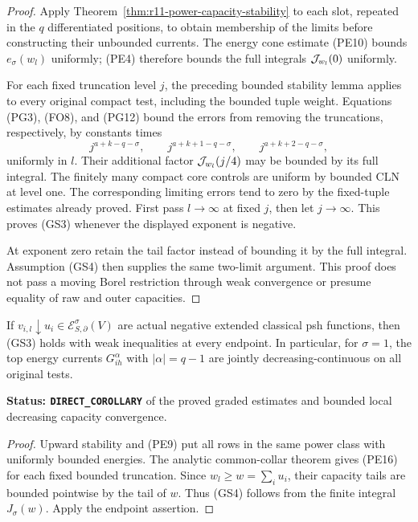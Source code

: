 \begin{proof}
Apply Theorem~\ref{thm:r11-power-capacity-stability} to
each slot, repeated in the $q$ differentiated positions,
to obtain membership of the limits before constructing
their unbounded currents. The energy cone estimate
(PE10) bounds $e_\sigma(w_l)$ uniformly; (PE4) therefore
bounds the full integrals $ {\cal J}_{w_l}(0)$ uniformly.

For each fixed truncation level $j$, the preceding
bounded stability lemma applies to every original
compact test, including the bounded tuple weight.
Equations (PG3), (FO8), and (PG12) bound the errors
from removing the truncations, respectively, by
constants times
\[
 j^{a+k-q-\sigma},\qquad
 j^{a+k+1-q-\sigma},\qquad
 j^{a+k+2-q-\sigma},
 \tag{GS5}
\]
uniformly in $l$. Their additional factor
$ {\cal J}_{w_l}(j/4)$ may be bounded by its full
integral. The finitely many compact core controls
are uniform by bounded CLN at level one.
The corresponding limiting errors tend to zero
by the fixed-tuple estimates already proved.
First pass $l\to\infty$ at fixed $j$, then let
$j\to\infty$. This proves (GS3) whenever the
displayed exponent is negative.

At exponent zero retain the tail factor instead
of bounding it by the full integral. Assumption
(GS4) then supplies the same two-limit argument.
This proof does not pass a moving Borel restriction
through weak convergence or presume equality of
raw and outer capacities.
\end{proof}

\begin{corollary}
\label{cor:r11-decreasing-graded-endpoints}
If $v_{i,l}\downarrow u_i\in
\mathcal E^\sigma_{S,\partial}(V)$ are actual negative
extended classical psh functions, then (GS3) holds
with weak inequalities at every endpoint.
In particular, for $\sigma=1$, the top energy
currents $G^\alpha_{ih}$ with $|\alpha|=q-1$
are jointly decreasing-continuous on all original tests.
\end{corollary}

\noindent\textbf{Status: \texttt{DIRECT\_COROLLARY}}
of the proved graded estimates and bounded local
decreasing capacity convergence.

\begin{proof}
Upward stability and (PE9) put all rows in the
same power class with uniformly bounded energies.
The analytic common-collar theorem gives (PE16)
for each fixed bounded truncation. Since
$w_l\geq w=\sum_i u_i$, their capacity tails
are bounded pointwise by the tail of $w$.
Thus (GS4) follows from the finite integral
$J_\sigma(w)$. Apply the endpoint assertion.
\end{proof}

